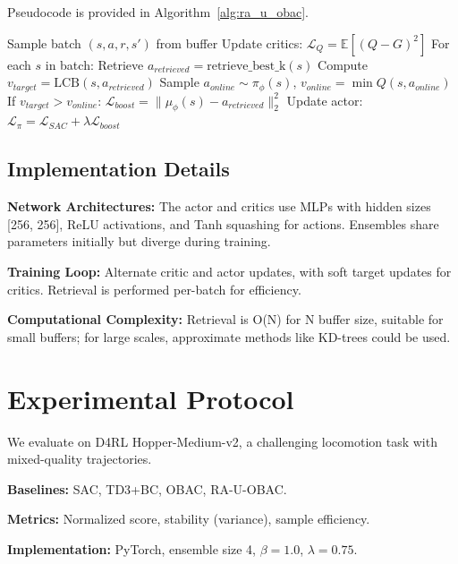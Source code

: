 \documentclass{article}
\begin{document}
Pseudocode is provided in Algorithm~\ref{alg:ra_u_obac}.

\begin{algorithm}[ht]
\caption{RA-U-OBAC Update Step}
\label{alg:ra_u_obac}
\begin{algorithmic}[1]
\State Sample batch $(s, a, r, s')$ from buffer
\State Update critics: $\mathcal{L}_Q = \mathbb{E} [(Q - G)^2]$
\State For each $s$ in batch:
\State \quad Retrieve $a_{retrieved} = \mathrm{retrieve\_best\_k}(s)$
\State \quad Compute $v_{target} = \mathrm{LCB}(s, a_{retrieved})$
\State \quad Sample $a_{online} \sim \pi_\phi(s)$, $v_{online} = \min Q(s, a_{online})$
\State \quad If $v_{target} > v_{online}$: $\mathcal{L}_{boost} = \| \mu_\phi(s) - a_{retrieved} \|_2^2$
\State Update actor: $\mathcal{L}_\pi = \mathcal{L}_{SAC} + \lambda \mathcal{L}_{boost}$
\end{algorithmic}
\end{algorithm}

\subsection{Implementation Details}

\textbf{Network Architectures:} The actor and critics use MLPs with hidden sizes [256, 256], ReLU activations, and Tanh squashing for actions. Ensembles share parameters initially but diverge during training.

\textbf{Training Loop:} Alternate critic and actor updates, with soft target updates for critics. Retrieval is performed per-batch for efficiency.

\textbf{Computational Complexity:} Retrieval is O(N) for N buffer size, suitable for small buffers; for large scales, approximate methods like KD-trees could be used.

\section{Experimental Protocol}
\label{sec:experiments}

We evaluate on D4RL Hopper-Medium-v2, a challenging locomotion task with mixed-quality trajectories.

\textbf{Baselines:} SAC, TD3+BC, OBAC, RA-U-OBAC.

\textbf{Metrics:} Normalized score, stability (variance), sample efficiency.

\textbf{Implementation:} PyTorch, ensemble size 4, $\beta=1.0$, $\lambda=0.75$.
\end{document}
